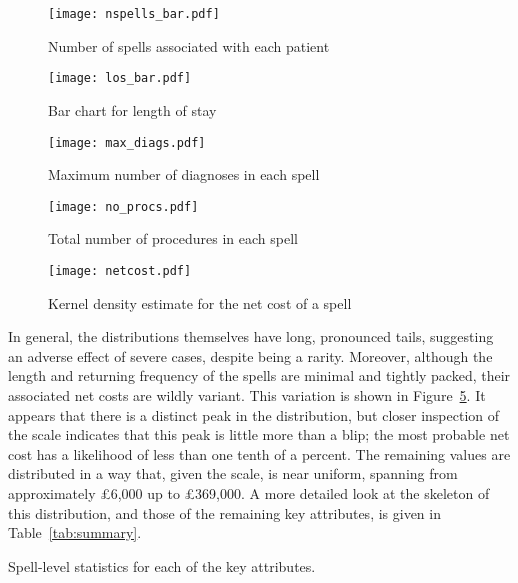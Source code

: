 \begin{figure}
    \centering
    \texttt{[image: nspells\_bar.pdf]}
    \caption{Number of spells associated with each patient}%
    \label{fig:no_spells}
\end{figure}

\begin{figure}
    \centering
    \texttt{[image: los\_bar.pdf]}
    \caption{Bar chart for length of stay}%
    \label{fig:los}
\end{figure}

\begin{figure}
    \centering
    \texttt{[image: max\_diags.pdf]}
    \caption{Maximum number of diagnoses in each spell}%
    \label{fig:no_diag}
\end{figure}

\begin{figure}
    \centering
    \texttt{[image: no\_procs.pdf]}
    \caption{Total number of procedures in each spell}%
    \label{fig:no_proc}
\end{figure}

\begin{figure}
    \centering
    \texttt{[image: netcost.pdf]}
    \caption{Kernel density estimate for the net cost of a spell}%
    \label{fig:netcost}
\end{figure}

In general, the distributions themselves have long, pronounced tails, suggesting
an adverse effect of severe cases, despite being a rarity. Moreover, although
the length and returning frequency of the spells are minimal and tightly packed,
their associated net costs are wildly variant. This variation is shown in
Figure~\ref{fig:netcost}. It appears that there is a distinct peak in the
distribution, but closer inspection of the scale indicates that this peak is
little more than a blip; the most probable net cost has a likelihood of less
than one tenth of a percent. The remaining values are distributed in a way that,
given the scale, is near uniform, spanning from approximately \pounds6,000 up to
\pounds369,000. A more detailed look at the skeleton of this distribution, and
those of the remaining key attributes, is given in Table~\ref{tab:summary}.

\begin{table}
    \centering
    \resizebox{\textwidth}{!}{%
        
    }
    \caption{Spell-level statistics for each of the key attributes.}%
    \label{tab:summary}
\end{table}

